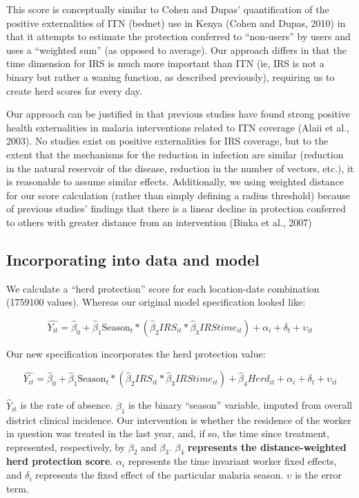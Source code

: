 \documentclass[]{article}
\begin{document}
This score is conceptually similar to Cohen and Dupas' quantification of
the positive externalities of ITN (bednet) use in Kenya (Cohen and
Dupas, 2010) in that it attempts to estimate the protection conferred to
``non-users'' by users and uses a ``weighted sum'' (as opposed to
average). Our approach differs in that the time dimension for IRS is
much more important than ITN (ie, IRS is not a binary but rather a
waning function, as described previously), requiring us to create herd
scores for every day.

Our approach can be justified in that previous studies have found strong
positive health externalities in malaria interventions related to ITN
coverage (Alaii et al., 2003). No studies exist on positive
externalities for IRS coverage, but to the extent that the mechanisms
for the reduction in infection are similar (reduction in the natural
reservoir of the disease, reduction in the number of vectors, etc.), it
is reasonable to assume similar effects. Additionally, we using weighted
distance for our score calculation (rather than simply defining a radius
threshold) because of previous studies' findings that there is a linear
decline in protection conferred to others with greater distance from an
intervention (Binka et al., 2007)

\subsection{Incorporating into data and
model}\label{incorporating-into-data-and-model}

We calculate a ``herd protection'' score for each location-date
combination (1759100 values). Whereas our original model specification
looked like:

\[
\hat{Y_{it}} = \hat{\beta}_{0} +  \hat{\beta}_{1}\text{Season}_{t} * (\hat{\beta}_2{IRS_{it}}*\hat{\beta}_3{IRStime_{it}}) + \alpha_i + \delta_t + \upsilon_{it}
\]

Our new specification incorporates the herd protection value:

\[
\hat{Y_{it}} = \hat{\beta}_{0} +  \hat{\beta}_{1}\text{Season}_{t} * (\hat{\beta}_2{IRS_{it}}*\hat{\beta}_3{IRStime_{it}}) +  \hat{\beta}_4{Herd_{it}} +  \alpha_i + \delta_t + \upsilon_{it}
\]

\(\hat{Y}_{it}\) is the rate of absence. \(\beta_{1}\) is the binary
``season'' variable, imputed from overall district clinical incidence.
Our intervention is whether the residence of the worker in question was
treated in the last year, and, if so, the time since treatment,
represented, respectively, by \(\beta_{2}\) and \(\beta_{3}\).
\(\beta_{4}\) \textbf{represents the distance-weighted herd protection
score}. \(\alpha_i\) represents the time invariant worker fixed effects,
and \(\delta_i\) represents the fixed effect of the particular malaria
season. \(\upsilon\) is the error term.
\end{document}
